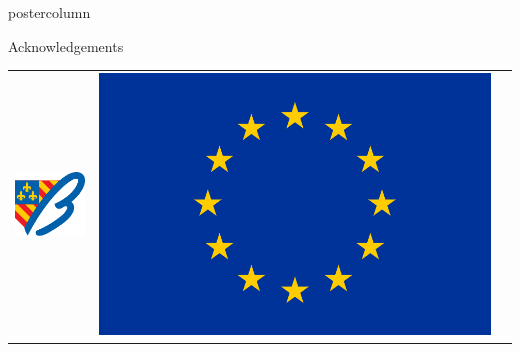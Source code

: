 \documentclass[final]{beamer}
\newlength{\columnheight}
\begin{document}
\begin{frame}
  \begin{columns}[t]
    \begin{column}{.49\textwidth}
	\begin{beamercolorbox}[center,wd=\textwidth]{postercolumn}
        \begin{minipage}[T]{.95\textwidth}  %
          \parbox[t][\columnheight]{\textwidth}{
            \begin{block}{Acknowledgements}
                \justifying
                    \begin{center}
        				\begin{tabular}{SSL} 
        				    \includegraphics[width=\linewidth]{content/logos/Bourgogne.pdf}  &		\includegraphics[width=\linewidth]{content/logos/Europe.pdf}  &	

\end{tabular}
\end{center}
\end{block}}
\end{minipage}
\end{beamercolorbox}
\end{column}
\end{columns}
\end{frame}
\end{document}
